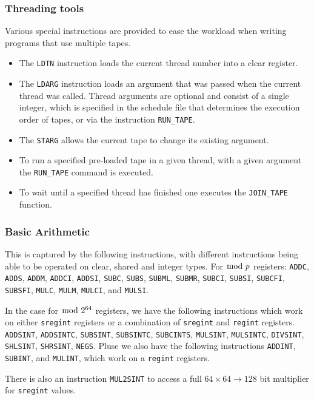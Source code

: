 \subsubsection{Threading tools}
Various special instructions are provided to ease the workload when writing
programs that use multiple tapes.
\begin{itemize}
\item The \verb+LDTN+ instruction loads the current thread number into
a clear register.
\item The \verb+LDARG+ instruction loads an argument that was passed
when the current thread was called.
Thread arguments are optional and consist of a single integer,
which is specified in the schedule file that determines the execution
order of tapes, or via the instruction \verb+RUN_TAPE+.
\item The \verb+STARG+ allows the current tape to change its
existing argument.
\item To run a specified pre-loaded tape in a given thread, with
a given argument the \verb+RUN_TAPE+ command is executed.
\item To wait until a specified thread has finished one executes
the \verb+JOIN_TAPE+ function.
\end{itemize}

\subsubsection{Basic Arithmetic}
This is captured by the following instructions,
with different instructions being able to be operated
on clear, shared and integer types.
For $\bmod \; p$ registers:
    \verb+ADDC+,
    \verb+ADDS+,
    \verb+ADDM+,
    \verb+ADDCI+,
    \verb+ADDSI+,
    \verb+SUBC+,
    \verb+SUBS+,
    \verb+SUBML+,
    \verb+SUBMR+,
    \verb+SUBCI+,
    \verb+SUBSI+,
    \verb+SUBCFI+,
    \verb+SUBSFI+,
    \verb+MULC+,
    \verb+MULM+,
    \verb+MULCI+,
    and
    \verb+MULSI+.

In  the case for $\bmod \; 2^{64}$ registers, we have the following instructions
which work on either \verb|sregint| registers or a combination
of \verb|sregint| and \verb|regint| registers.
	\verb+ADDSINT+,
	\verb+ADDSINTC+,
	\verb+SUBSINT+,
	\verb+SUBSINTC+,
	\verb+SUBCINTS+,
	\verb+MULSINT+,
	\verb+MULSINTC+,
	\verb+DIVSINT+,
	\verb+SHLSINT+,
	\verb+SHRSINT+,
	\verb+NEGS+.
Pluse we also have the following instructions
  \verb+ADDINT+,
  \verb+SUBINT+, and
  \verb+MULINT+,
which work on a \verb|regint| registers.

There is also an instruction \verb+MUL2SINT+ to access a
full $64 \times 64 \longrightarrow 128$ bit multiplier
for \verb|sregint| values.

